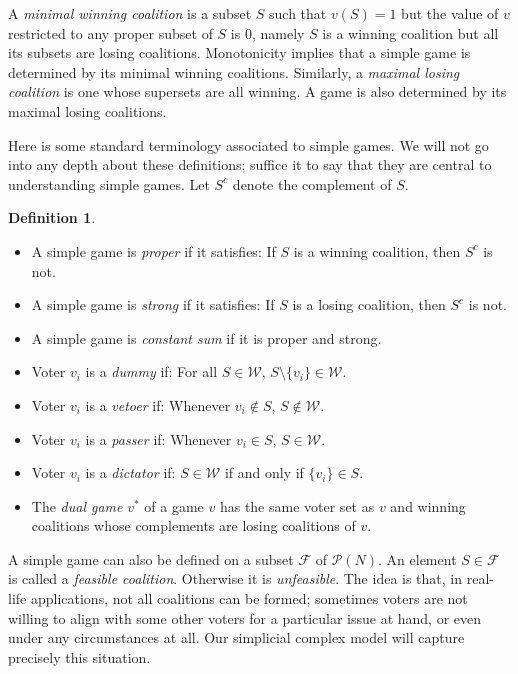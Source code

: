 \documentclass[11pt]{amsart}
\theoremstyle{plain}
\theoremstyle{definition}
\newtheorem{defin}[thm]{Definition}
\theoremstyle{remark}
\begin{document}
A \emph{minimal winning coalition} is a subset $S$ such that $v(S)=1$ but the value of $v$ restricted to any proper subset of $S$ is 0, namely $S$ is a winning coalition but all its subsets are losing coalitions. Monotonicity implies that a simple game is determined by its minimal winning coalitions. Similarly, a \emph{maximal losing coalition} is one whose supersets are all winning. A game is also determined by its maximal losing coalitions.

Here is some standard terminology associated to simple games. We will not go into any depth about these definitions; suffice it to say that they are central to understanding simple games. Let $S^c$ denote the complement of $S$.

\begin{defin}\label{D:GameStuff}
\ 
\begin{itemize}
\item
A simple game is \emph{proper} if it satisfies: If $S$ is a winning coalition, then $S^c$ is not.
\item
A simple game is \emph{strong} if it satisfies: If $S$ is a losing coalition, then $S^c$ is not. 
 \item
A simple game is \emph{constant sum} if it is proper and strong. 
\item Voter $v_i$ is a \emph{dummy} if: For all $S\in \mathcal{W}$, $S\setminus \{v_i\}\in \mathcal{W}$.
\item Voter $v_i$ is a \emph{vetoer} if: Whenever $v_i\notin S$,  $S\notin \mathcal{W}$.
\item Voter $v_i$ is a \emph{passer} if: Whenever $v_i\in S$,  $S\in \mathcal{W}$.
\item Voter $v_i$ is a \emph{dictator} if:  $S\in \mathcal{W}$ if and only if $\{v_i\}\in S$. 
\item The \emph{dual game} $v^*$ of a game $v$ has the same voter set as $v$ and winning coalitions whose complements are losing coalitions of $v$.
\end{itemize}
\end{defin}

A simple game can also be defined on a subset $\mathcal F$ of $\mathcal P(N)$. An element $S\in \mathcal F$ is called a \emph{feasible coalition}. Otherwise it is \emph{unfeasible}. The idea is that, in real-life applications, not all coalitions can be formed; sometimes voters are not willing to align with some other voters for a particular issue at hand, or even under any circumstances at all. Our simplicial complex model will capture precisely this situation.
\end{document}
